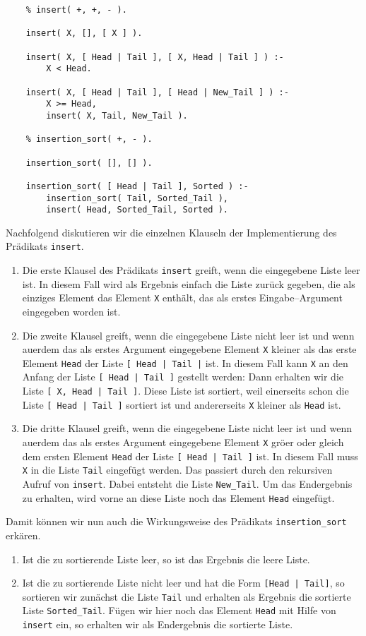 \begin{verbatim}
    % insert( +, +, - ).

    insert( X, [], [ X ] ). 

    insert( X, [ Head | Tail ], [ X, Head | Tail ] ) :-
        X < Head.

    insert( X, [ Head | Tail ], [ Head | New_Tail ] ) :-
        X >= Head,
        insert( X, Tail, New_Tail ).

    % insertion_sort( +, - ).

    insertion_sort( [], [] ).

    insertion_sort( [ Head | Tail ], Sorted ) :-
        insertion_sort( Tail, Sorted_Tail ),
        insert( Head, Sorted_Tail, Sorted ).
\end{verbatim}
Nachfolgend diskutieren wir die einzelnen Klauseln der Implementierung des Pr\"{a}dikats \texttt{insert}.
\begin{enumerate}
\item Die erste Klausel des Pr\"{a}dikats \texttt{insert} greift, wenn die eingegebene Liste leer ist.
      In diesem Fall wird als Ergebnis einfach die Liste zur\"{u}ck gegeben, die als einziges Element
      das Element \texttt{X} enth\"{a}lt, das als erstes Eingabe--Argument eingegeben worden ist.
\item Die zweite Klausel greift, wenn die eingegebene Liste nicht leer ist und wenn au\3erdem
      das als erstes Argument eingegebene Element \texttt{X} kleiner als das  erste Element \texttt{Head}
      der Liste \texttt{[ Head | Tail |} ist. In diesem Fall kann \texttt{X} an den Anfang der 
      Liste \texttt{[ Head | Tail ]}  gestellt werden: Dann erhalten wir die Liste \texttt{[ X, Head | Tail ]}.
      Diese Liste ist sortiert, weil einerseits schon die Liste \texttt{[ Head | Tail ]} sortiert ist
      und andererseits \texttt{X} kleiner als \texttt{Head} ist.
\item Die dritte Klausel greift, wenn die eingegebene Liste nicht leer ist und wenn au\3erdem
      das als erstes Argument eingegebene Element \texttt{X} gr\"{o}\3er oder gleich dem ersten Element \texttt{Head}
      der Liste  \texttt{[ Head | Tail ]} ist.  In diesem Fall muss \texttt{X} 
      in die Liste \texttt{Tail} eingef\"{u}gt werden.  Das passiert durch den rekursiven Aufruf von \texttt{insert}.
      Dabei entsteht die Liste \texttt{New\_Tail}.  Um das Endergebnis zu erhalten, wird vorne an diese Liste noch das Element
      \texttt{Head} eingef\"{u}gt.
\end{enumerate}
Damit k\"{o}nnen wir nun auch die Wirkungsweise des Pr\"{a}dikats \texttt{insertion\_sort} erk\"{a}ren.
\begin{enumerate}
\item Ist die zu sortierende Liste leer, so ist das Ergebnis die leere Liste.
\item Ist die zu sortierende Liste nicht leer und hat die Form \texttt{[Head | Tail]}, so sortieren wir zun\"{a}chst die
      Liste \texttt{Tail} und erhalten als Ergebnis die sortierte Liste \texttt{Sorted\_Tail}.  F\"{u}gen wir hier
      noch das Element \texttt{Head} mit Hilfe von \texttt{insert} ein, so erhalten wir als Endergebnis
      die sortierte Liste.
\end{enumerate}


